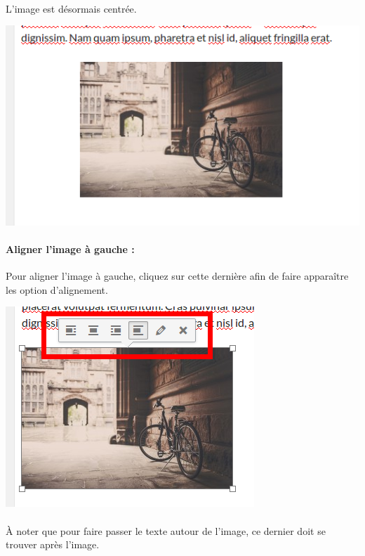 \documentclass[10pt,a4paper]{article}
\begin{document}
\paragraph{}L'image est désormais centrée.
\begin{center}
\includegraphics[scale=0.3]{img/0109.png}
\end{center}
\paragraph{Aligner l'image à gauche : }Pour aligner l'image à gauche, cliquez sur cette dernière afin de faire apparaître les option d'alignement.
\begin{center}
\includegraphics[scale=0.3]{img/0107.png}
\end{center}
\paragraph{}À noter que pour faire passer le texte autour de l'image, ce dernier doit se trouver après l'image.
\end{document}
